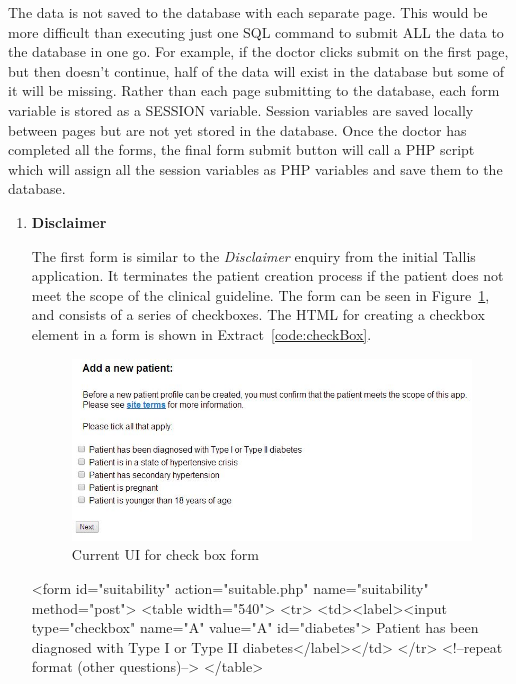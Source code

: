 \documentclass[11pt]{article}
\begin{document}
The data is not saved to the database with each separate page. This would be more difficult than executing just one SQL command to submit ALL the data to the database in one go. For example, if the doctor clicks submit on the first page, but then doesn't continue, half of the data will exist in the database but some of it will be missing. Rather than each page submitting to the database, each form variable is stored as a SESSION variable. Session variables are saved locally between pages but are not yet stored in the database. Once the doctor has completed all the forms, the final form submit button will call a PHP script which will assign all the session variables as PHP variables and save them to the database.
\begin{enumerate}
\item \textbf{Disclaimer}

The first form is similar to the \textit{Disclaimer} enquiry from the initial Tallis application. It terminates the patient creation process if the patient does not meet the scope of the clinical guideline. The form can be seen in Figure~\ref{fig:formCheckBox}, and consists of a series of checkboxes. The HTML for creating a checkbox element in a form is shown in Extract~\ref{code:checkBox}.

\begin{figure}[ht]
\begin{center}
\includegraphics[scale=0.5]{formCheckBox}
\caption{Current UI for check box form}
\label{fig:formCheckBox}
\end{center}
\end{figure}


\begin{code}[ht]
\begin{html}
<form id="suitability" action="suitable.php" name="suitability" method="post">
  <table width="540">
     <tr>
     <td><label><input type="checkbox" name="A" value="A" id="diabetes">
     Patient has been diagnosed with Type I or Type II diabetes</label></td>
     </tr>
     <!--repeat format (other questions)-->
  </table>


\end{html}
\end{code}
\end{enumerate}
\end{document}

